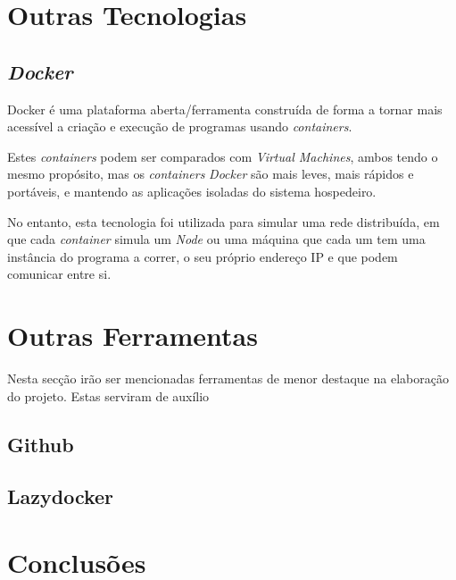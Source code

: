 \section{Outras Tecnologias}
\label{chap3:outras_tecnologias}
\subsection{\emph{Docker}}

Docker é uma plataforma aberta/ferramenta construída de forma a tornar mais acessível a criação e execução de programas  usando \emph{containers}.


Estes \emph{containers} podem ser comparados com \emph{Virtual Machines}, ambos tendo o mesmo propósito, mas os \emph{containers} \emph{Docker} são mais leves, mais rápidos e portáveis, e mantendo as aplicações isoladas do sistema hospedeiro.


No entanto, esta tecnologia foi utilizada para simular uma rede distribuída, em que cada \emph{container} simula um \emph{Node} ou uma máquina que cada um tem uma instância do programa a correr, o seu próprio endereço \acs{IP} e que podem comunicar entre si.




\section{Outras Ferramentas}
\label{chap3:outras_ferramentas}
Nesta secção irão ser mencionadas ferramentas de menor destaque na elaboração do projeto. Estas serviram de auxílio 
\subsection{Github}
\subsection{Lazydocker}

\section{Conclusões}
\label{chap3:sec:concs}
